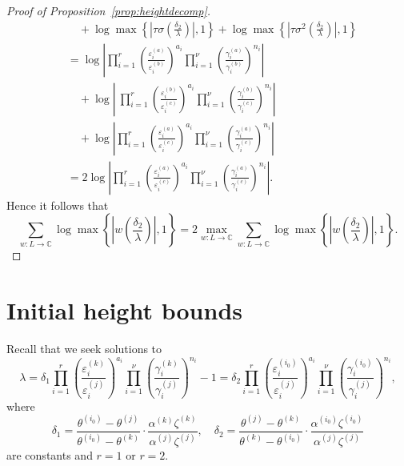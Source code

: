 \begin{proof}[Proof of Proposition~\ref{prop:heightdecomp}]
\begin{align*}
		& \quad+ \log \max \left\{ \left|\tau\sigma\left(\frac{\delta_2}{\lambda}\right)\right|, 1\right\} + \log \max \left\{ \left|\tau\sigma^2\left(\frac{\delta_2}{\lambda}\right)\right|, 1\right\}\\
	& = \log \left|\prod_{i = 1}^{r}\left( \frac{\varepsilon_i^{(a)}}{\varepsilon_i^{(b)}}\right)^{a_i} \prod_{i = 1}^{\nu} \left( \frac{\gamma_i^{(a)}}{\gamma_i^{(b)}}\right)^{n_i} \right|\\
		& \quad + \log \left|\ \prod_{i = 1}^{r}\left( \frac{\varepsilon_i^{(b)}}{\varepsilon_i^{(c)}}\right)^{a_i} \prod_{i = 1}^{\nu} \left( \frac{\gamma_i^{(b)}}{\gamma_i^{(c)}}\right)^{n_i} \right|\\
		& \quad+ \log \left| \prod_{i = 1}^{r}\left( \frac{\varepsilon_i^{(a)}}{\varepsilon_i^{(c)}}\right)^{a_i} \prod_{i = 1}^{\nu} \left( \frac{\gamma_i^{(a)}}{\gamma_i^{(c)}}\right)^{n_i} \right|\\
	& = 2\log  \left|\prod_{i = 1}^{r}\left( \frac{\varepsilon_i^{(a)}}{\varepsilon_i^{(c)}}\right)^{a_i} \prod_{i = 1}^{\nu} \left( \frac{\gamma_i^{(a)}}{\gamma_i^{(c)}}\right)^{n_i} \right|.
\end{align*}
Hence it follows that
\[\sum_{w :L \to \mathbb{C}} \log \max \left\{ \left|w\left(\frac{\delta_2}{\lambda}\right)\right|, 1\right\} = 
2\max_{w:L\to \mathbb{C}}\sum_{w :L \to \mathbb{C}} \log \max \left\{ \left|w\left(\frac{\delta_2}{\lambda}\right)\right|, 1\right\}.\]
\end{proof}

\section{Initial height bounds}

Recall that we seek solutions to
\begin{equation*}
\lambda = \delta_1 \prod_{i = 1}^r\left( \frac{\varepsilon_i^{(k)}}{\varepsilon_i^{(j)}}\right)^{a_i}\prod_{i = 1}^{\nu} \left( \frac{\gamma_i^{(k)}}{\gamma_i^{(j)}}\right)^{n_i} - 1 = \delta_2 \prod_{i = 1}^{r}\left( \frac{\varepsilon_i^{(i_0)}}{\varepsilon_i^{(j)}}\right)^{a_i} \prod_{i = 1}^{\nu} \left( \frac{\gamma_i^{(i_0)}}{\gamma_i^{(j)}}\right)^{n_i},
\end{equation*}
where
\[\delta_1 = \frac{\theta^{(i_0)} - \theta^{(j)}}{\theta^{(i_0)} - \theta^{(k)}}\cdot\frac{\alpha^{(k)}\zeta^{(k)}}{\alpha^{(j)}\zeta^{(j)}}, \quad \delta_2 = \frac{\theta^{(j)} - \theta^{(k)}}{\theta^{(k)} - \theta^{(i_0)}}\cdot \frac{\alpha^{(i_0)}\zeta^{(i_0)}}{\alpha^{(j)}\zeta^{(j)}}\]
are constants and $r = 1$ or $r = 2$. 

